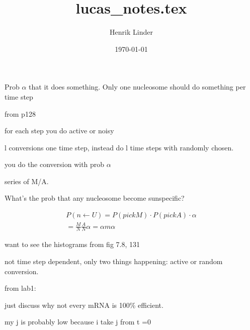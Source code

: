 \documentclass{article}
\title{lucas_notes.tex }
\author{Henrik Linder}
\date{\today}
\begin{document}
\maketitle


Prob $\alpha$ that it does something. Only one nucleosome should do something per time step 

from p128 

for each step you do active or noisy 

l conversions one time step, instead do l time steps with randomly chosen.


you do the conversion with prob $\alpha$

series of M/A. 

What's the prob that any nucleosome become sunspecific? 

\begin{equation}
	\begin{split}
	P(n\leftarrow U) = P(pick M)\cdot P(pick A) \cdot \alpha\\
	= \frac{M}{N} \frac{A}{N}\alpha = \alpha m \alpha
	\end{split}
\end{equation}

want to see the histograms from fig 7.8, 131

not time step dependent, only two things happening: active or random conversion. 



from lab1: 

just discuss why not every mRNA is 100\% efficient. 
 
my j is probably low because i take j from t =0 
\end{document}
